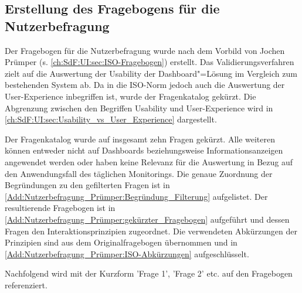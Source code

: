 \subsection{Erstellung des Fragebogens für die Nutzerbefragung}
\label{ch:Validierung:sec:Material:Nutzerbefragung}

Der Fragebogen für die Nutzerbefragung wurde nach dem Vorbild von Jochen Prümper \cite{Pruemper:Fragebogen-S:2006} (s. \autoref{ch:SdF:UI:sec:ISO-Fragebogen}) erstellt. Das Validierungsverfahren zielt auf die Auswertung der Usability der Dash\-board"=Lösung im Vergleich zum bestehenden System ab. Da in die ISO-Norm jedoch auch die Auswertung der User-Experience inbegriffen ist, wurde der Fragenkatalog gekürzt. Die Abgrenzung zwischen den Begriffen Usability und User-Experience wird in \autoref{ch:SdF:UI:sec:Usability_vs_User_Experience} dargestellt.

Der Fragenkatalog wurde auf insgesamt zehn Fragen gekürzt. Alle weiteren können entweder nicht auf Dash\-boards beziehungsweise Informationsanzeigen angewendet werden oder haben keine Relevanz für die Auswertung in Bezug auf den Anwendungsfall des täglichen Monitorings. Die genaue Zuordnung der Begründungen zu den gefilterten Fragen ist in \autoref{Add:Nutzerbefragung_Prümper:Begründung_Filterung} aufgelistet.
Der resultierende Fragebogen ist in \autoref{Add:Nutzerbefragung_Prümper:gekürzter_Fragebogen} aufgeführt und dessen Fragen den Interaktionsprinzipien zugeordnet. Die verwendeten Abkürzungen der Prinzipien sind aus dem Originalfragebogen übernommen und in \autoref{Add:Nutzerbefragung_Prümper:ISO-Abkürzungen} aufgeschlüsselt.

Nachfolgend wird mit der Kurzform 'Frage 1', 'Frage 2' etc. auf den Fragebogen referenziert.



